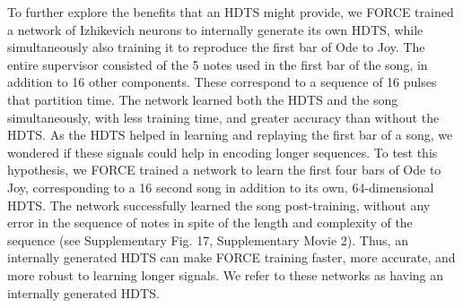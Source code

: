 \documentclass[11pt]{article} %
\begin{document}
To further explore the benefits that an HDTS might provide, we FORCE trained a network of Izhikevich neurons to internally generate its own HDTS, while simultaneously also training it to reproduce the first bar of Ode to Joy.  The entire supervisor consisted of the 5 notes used in the first bar of the song, in addition to 16 other components.  These correspond to a sequence of 16 pulses that partition time.  The network learned both the HDTS and the song simultaneously, with less training time, and greater accuracy than without the HDTS.  As the HDTS helped in learning and replaying the first bar of a song, we wondered if these signals could help in encoding longer sequences.  To test this hypothesis, we FORCE trained a network to learn the first four bars of Ode to Joy, corresponding to a 16 second song in addition to its own, 64-dimensional HDTS.  The network successfully learned the song post-training, without any error in the sequence of notes in spite of the length and complexity of the sequence (see Supplementary Fig. 17, Supplementary Movie 2).  Thus, an internally generated HDTS can make FORCE training faster, more accurate, and more robust to learning longer signals.  We refer to these networks as having an internally generated HDTS.    


\end{document}
